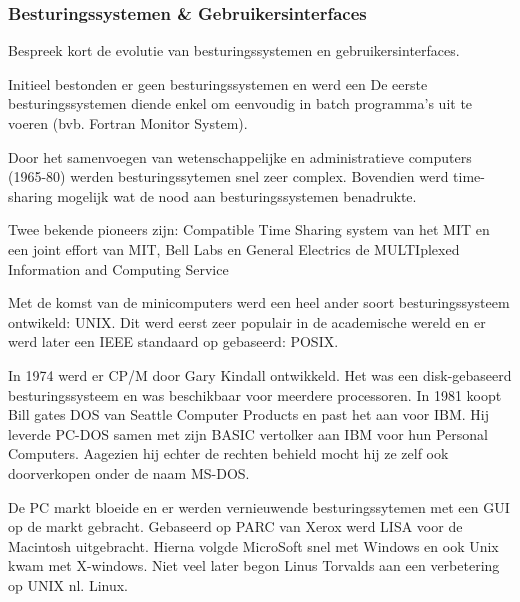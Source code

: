 \documentclass[../main.tex]{subfiles}
\begin{document}
\subsubsection{Besturingssystemen \& Gebruikersinterfaces}
\begin{question}
Bespreek kort de evolutie van besturingssystemen en gebruikersinterfaces.
\end{question}
\begin{solution}
		Initieel bestonden er geen besturingssystemen en werd een  
		De eerste besturingssystemen diende enkel om eenvoudig in batch programma's uit te voeren (bvb. Fortran Monitor System).

		Door het samenvoegen van wetenschappelijke en administratieve computers (1965-80) werden besturingssytemen snel zeer complex.
		Bovendien werd time-sharing mogelijk wat de nood aan besturingssystemen benadrukte.

		Twee bekende pioneers zijn: Compatible Time Sharing system van het MIT en een joint effort van MIT, Bell Labs en General Electrics de MULTIplexed Information and Computing Service
		
		Met de komst van de minicomputers werd een heel ander soort besturingssysteem ontwikeld: UNIX.
		Dit werd eerst zeer populair in de academische wereld en er werd later een IEEE standaard op gebaseerd: POSIX.

		In 1974 werd er CP/M door Gary Kindall ontwikkeld. Het was een disk-gebaseerd besturingssysteem en was beschikbaar voor meerdere processoren.
		In 1981 koopt Bill gates DOS van Seattle Computer Products en past het aan voor IBM.
		Hij leverde PC-DOS samen met zijn BASIC vertolker aan IBM voor hun Personal Computers.
		Aagezien hij echter de rechten behield mocht hij ze zelf ook doorverkopen onder de naam MS-DOS.

		De PC markt bloeide en er werden vernieuwende besturingssytemen met een GUI op de markt gebracht.
		Gebaseerd op PARC van Xerox werd LISA voor de Macintosh uitgebracht.
		Hierna volgde MicroSoft snel met Windows en ook Unix kwam met X-windows.
		Niet veel later begon Linus Torvalds aan een verbetering op UNIX nl. Linux.
\end{solution}
\end{document}
